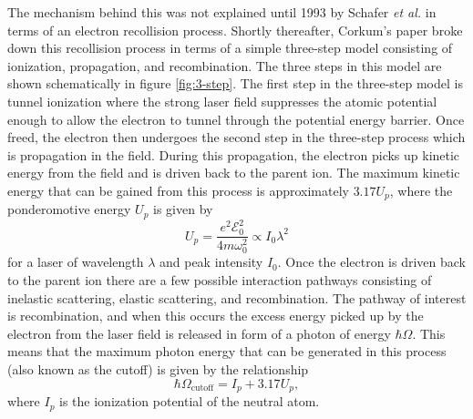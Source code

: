 The mechanism behind this was not explained until 1993 by Schafer \textit{et al.} \cite{schaferThresholdIonizationHigh1993} in terms of an electron recollision process.  Shortly thereafter, Corkum's paper \cite{corkumPlasmaPerspectiveStrong1993} broke down this recollision process in terms of a simple three-step model consisting of ionization, propagation, and recombination.  The three steps in this model are shown schematically in figure \ref{fig:3-step}.  The first step in the three-step model is tunnel ionization where the strong laser field suppresses the atomic potential enough to allow the electron to tunnel through the potential energy barrier.  Once freed, the electron then undergoes the second step in the three-step process which is propagation in the field.  During this propagation, the electron picks up kinetic energy from the field and is driven back to the parent ion.  The maximum kinetic energy that can be gained from this process is approximately $3.17 U_p$, where the ponderomotive energy $U_p$ is given by
\begin{equation}
	U_p = \frac{e^2 \mathcal{E}_0^2}{4 m \omega_0^2}\propto I_0\lambda^2
\end{equation}
for a laser of wavelength $\lambda$ and peak intensity $I_0$.  Once the electron is driven back to the parent ion there are a few possible interaction pathways consisting of inelastic scattering, elastic scattering, and recombination.  The pathway of interest is recombination, and  when this occurs the excess energy picked up by the electron from the laser field is released in form of a photon of energy $\hbar\Omega$.  This means that the maximum photon energy that can be generated in this process (also known as the cutoff) is given by the relationship
\begin{equation}
	\hbar\Omega_{\mathrm{cutoff}} = I_p + 3.17 U_p,
\end{equation}
where $I_p$ is the ionization potential of the neutral atom.

